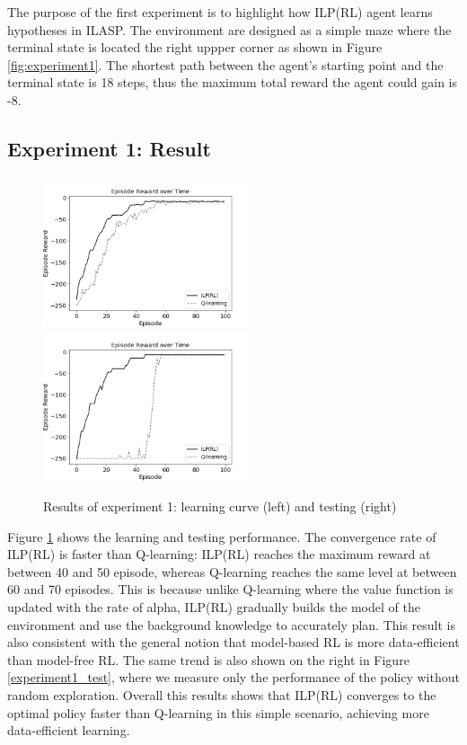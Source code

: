 The purpose of the first experiment is to highlight how ILP(RL) agent learns hypotheses in ILASP.
The environment are designed as a simple maze where the terminal state is located the right uppper corner as shown in Figure \ref{fig:experiment1}.
The shortest path between the agent's starting point and the terminal state is 18 steps, thus the maximum total reward the agent could gain is -8.
    
\subsection{Experiment 1: Result}
\label{subsec:experiment1_result}

\begin{figure}[!htb]
\centerline{
\includegraphics[width=0.55\textwidth]{./figures/experiment1_training}
\includegraphics[width=0.55\textwidth]{./figures/experiment1_test}
}
\caption{Results of experiment 1: learning curve (left) and testing (right)}
\label{experiment1_result}
\end{figure}

Figure \ref{experiment1_result} shows the learning and testing performance.
The convergence rate of ILP(RL) is faster than Q-learning: ILP(RL) reaches the maximum reward at between 40 and 50 episode, 
whereas Q-learning reaches the same level at between 60 and 70 episodes.
This is because unlike Q-learning where the value function is updated with the rate of alpha, ILP(RL) gradually builds the model of the environment and use the background knowledge to accurately plan.
This result is also consistent with the general notion that model-based RL is more data-efficient than model-free RL.
The same trend is also shown on the right in Figure \ref{experiment1_test}, where we measure only the performance of the policy without random exploration.
Overall this results shows that ILP(RL) converges to the optimal policy faster than Q-learning in this simple scenario, achieving more data-efficient learning.


